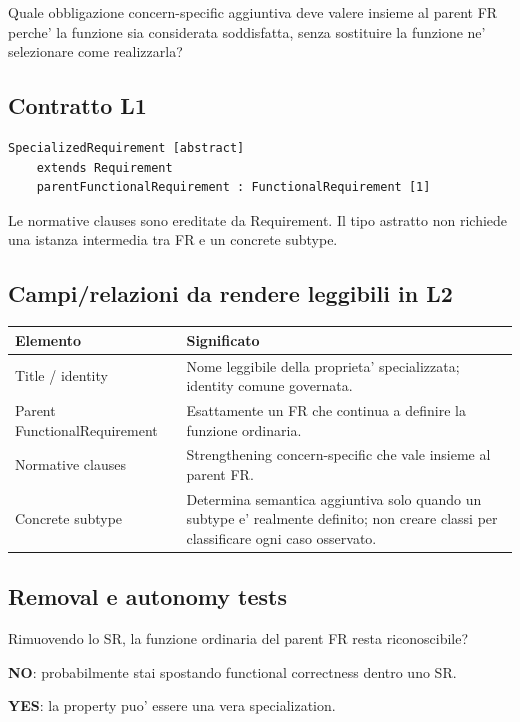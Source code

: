\documentclass[11pt,a4paper]{article}
\begin{document}
\begin{ddtacheck}[title={Domanda fondamentale}]
Quale obbligazione concern-specific aggiuntiva deve valere insieme al parent FR perche' la funzione sia considerata soddisfatta, senza sostituire la funzione ne' selezionare come realizzarla?
\end{ddtacheck}

\subsection{Contratto L1}

\begin{lstlisting}
SpecializedRequirement [abstract]
    extends Requirement
    parentFunctionalRequirement : FunctionalRequirement [1]
\end{lstlisting}

Le normative clauses sono ereditate da Requirement. Il tipo astratto non richiede una istanza intermedia tra FR e un concrete subtype.

\subsection{Campi/relazioni da rendere leggibili in L2}

\begin{tabularx}{\textwidth}{L{42mm}Y}
\toprule
\textbf{Elemento} & \textbf{Significato} \\
\midrule
Title / identity & Nome leggibile della proprieta' specializzata; identity comune governata. \\
Parent FunctionalRequirement & Esattamente un FR che continua a definire la funzione ordinaria. \\
Normative clauses & Strengthening concern-specific che vale insieme al parent FR. \\
Concrete subtype & Determina semantica aggiuntiva solo quando un subtype e' realmente definito; non creare classi per classificare ogni caso osservato. \\
\bottomrule
\end{tabularx}

\subsection{Removal e autonomy tests}

\begin{ddtacheck}[title={Removal test}]
Rimuovendo lo SR, la funzione ordinaria del parent FR resta riconoscibile?\par
\textbf{NO}: probabilmente stai spostando functional correctness dentro uno SR.\par
\textbf{YES}: la property puo' essere una vera specialization.
\end{ddtacheck}
\end{document}
